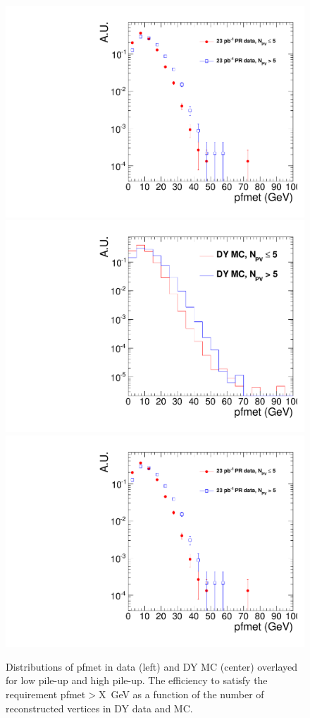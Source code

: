 \newcommand{\met}{\ensuremath{\mspace{3mu}/\mspace{-12.0mu}E_{T}}} 


\begin{figure}[hbt]
\begin{center}
\includegraphics[width=0.3\linewidth]{figures/pfmet_data.pdf} 
\includegraphics[width=0.3\linewidth]{figures/pfmet_dymc.pdf}
\includegraphics[width=0.3\linewidth]{figures/pfmet_data.pdf} %
\caption{\label{fig:met_pu}\protect Distributions of pfmet in data (left) and DY MC (center) 
overlayed for low pile-up and high pile-up. The efficiency to satisfy the requirement pfmet$>$X~GeV as a function
of the number of reconstructed vertices in DY data and MC.}
\end{center}
\end{figure}

